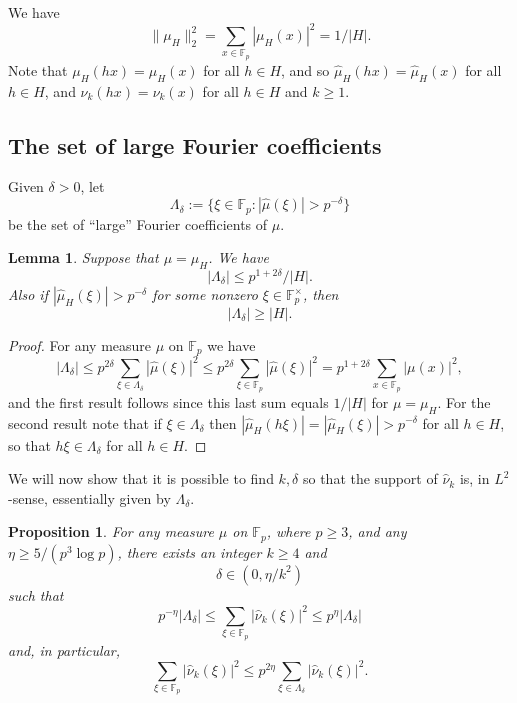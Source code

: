 \documentclass[11pt]{amsart}
\newtheorem{lem}[thm]{Lemma}
\newtheorem{prop}[thm]{Proposition}
\newcommand{\fp}{\mathbb{F}_p}
\newcommand{\muh}{{\mu_H}}
\newcommand{\nuhat}{{\widehat{\nu}}}
\newcommand{\muhat}{{\widehat{\mu}}}
\newcommand{\norm}[1]{\|#1\|_2}   %
\begin{document}
We have
$$
\norm{\muh}^2 = \sum_{x \in \fp} |\muh(x)|^2 = 1/|H| .
$$
Note that $\muh(hx)=\muh(x)$ for all $h\in H$, and so
$\muhat_H(hx)=\muhat_H(x)$ for all $h\in H$, and
$\nu_k(hx)=\nu_k(x)$ for all $h\in H$ and $k\geq 1$.



\subsection{The set of large Fourier coefficients}

Given $\delta>0$, let
$$
\Lambda_\delta := \{ \xi \in \fp : |\muhat(\xi)| > p^{-\delta}\}
$$
be the set of ``large'' Fourier coefficients of $\mu$.


\begin{lem}
\label{l:lambda-delta-size} Suppose that $\mu=\muh$. We have
$$
|\Lambda_\delta| \leq p^{1+2\delta}/|H|.
$$
Also if $|\muhat_H(\xi)|>p^{-\delta}$ for some {\em nonzero} $\xi
\in \fp^\times$, then
$$
|\Lambda_\delta| \geq |H|.
$$
\end{lem}
\begin{proof} For any measure $\mu$ on $\fp$ we have
$$
|\Lambda_\delta| \leq p^{2\delta} \sum_{\xi \in \Lambda_\delta}
|\muhat(\xi)|^2 \leq p^{2\delta} \sum_{\xi \in \fp} |\muhat(\xi)|^2
=p^{1+2\delta} \sum_{x \in \fp} |\mu (x)|^2,
$$
and the first result follows since this last sum equals $1/|H|$ for
$\mu=\muh$. For the second result note that if
$\xi\in\Lambda_\delta$  then $|\muhat_H(h\xi)|=|\muhat_H(\xi)|
> p^{-\delta}$ for all $h\in H$, so that $ h\xi\in\Lambda_\delta$ for all $h\in H$.
\end{proof}


We will now show that it is possible to find $k,\delta$ so that the
support of $\nuhat_k$ is, in $L^2$-sense, essentially given by
$\Lambda_\delta$.

\begin{prop}
\label{p:finding-Lambda-sub-delta} For any measure $\mu$ on $\fp$,
where $p \geq 3$, and any $\eta \geq 5/(p^3 \log p)$, there exists an
integer $k \geq 4$ and
$$
\delta \in (0, \eta/k^2)
$$
such that
\begin{equation} \label{eq:lambda-delta-size-vs-l2-norm}
p^{-\eta} |\Lambda_\delta| \leq \sum_{\xi \in \fp}
|\nuhat_k(\xi)|^2 \leq p^{\eta} |\Lambda_\delta|
\end{equation}
and, in particular,
\begin{equation} \label{eq:l2-support-is-lambda-delta}
\sum_{\xi \in \fp} |\nuhat_k(\xi)|^2 \leq p^{2\eta} \sum_{\xi \in
\Lambda_\delta} |\nuhat_k(\xi)|^2.
\end{equation}
\end{prop}
\end{document}
